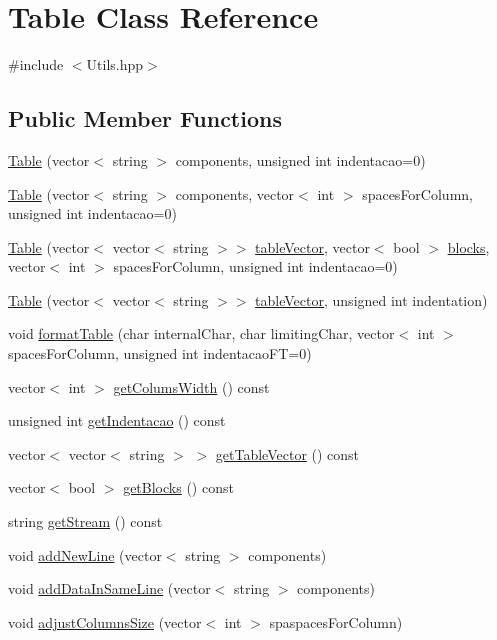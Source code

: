 \hypertarget{class_table}{}\section{Table Class Reference}
\label{class_table}


{\ttfamily \#include $<$Utils.\+hpp$>$}

\subsection*{Public Member Functions}
\begin{DoxyCompactItemize}
\item 
\hyperlink{class_table_a80b23f471aa594c4d1a1db51a22fb6c4}{Table} (vector$<$ string $>$ components, unsigned int indentacao=0)
\item 
\hyperlink{class_table_a65aecaa868a14218cbecb86437f996c1}{Table} (vector$<$ string $>$ components, vector$<$ int $>$ spaces\+For\+Column, unsigned int indentacao=0)
\item 
\hyperlink{class_table_a9abee52d5b062c43f79bfe55c67b7759}{Table} (vector$<$ vector$<$ string $>$$>$ \hyperlink{class_table_a9052c218f9eae23950459720e8069e62}{table\+Vector}, vector$<$ bool $>$ \hyperlink{class_table_a733288d34b5fd55085572f212fbe0260}{blocks}, vector$<$ int $>$ spaces\+For\+Column, unsigned int indentacao=0)
\item 
\hyperlink{class_table_a49c13a4307cb192d0a449f948dda66e2}{Table} (vector$<$ vector$<$ string $>$$>$ \hyperlink{class_table_a9052c218f9eae23950459720e8069e62}{table\+Vector}, unsigned int indentation)
\item 
void \hyperlink{class_table_a3c9712fbea1a7101e5aa28adc42d50b5}{format\+Table} (char internal\+Char, char limiting\+Char, vector$<$ int $>$ spaces\+For\+Column, unsigned int indentacao\+FT=0)
\item 
vector$<$ int $>$ \hyperlink{class_table_ab6541bd5783a13f8958e7def259ad844}{get\+Colums\+Width} () const
\item 
unsigned int \hyperlink{class_table_aa6fd97bbceb82d9acddf1858f3dbfc14}{get\+Indentacao} () const
\item 
vector$<$ vector$<$ string $>$ $>$ \hyperlink{class_table_a4a3ecdc1ad22d0dadd116af3cda3a74d}{get\+Table\+Vector} () const
\item 
vector$<$ bool $>$ \hyperlink{class_table_aeefe34b1ca9fa483b3605f9d6adbfdb5}{get\+Blocks} () const
\item 
string \hyperlink{class_table_a695b8d8f464194e26bcf23e07cd216bd}{get\+Stream} () const
\item 
void \hyperlink{class_table_a8d1739ca805a00714d030303124c2927}{add\+New\+Line} (vector$<$ string $>$ components)
\item 
void \hyperlink{class_table_ac1fcf6cb33298c4fbfa5457e0b276738}{add\+Data\+In\+Same\+Line} (vector$<$ string $>$ components)
\item 
void \hyperlink{class_table_aee12cc19eef2f8d152d92c6c92011207}{adjust\+Columns\+Size} (vector$<$ int $>$ spaspaces\+For\+Column)
\end{DoxyCompactItemize}
